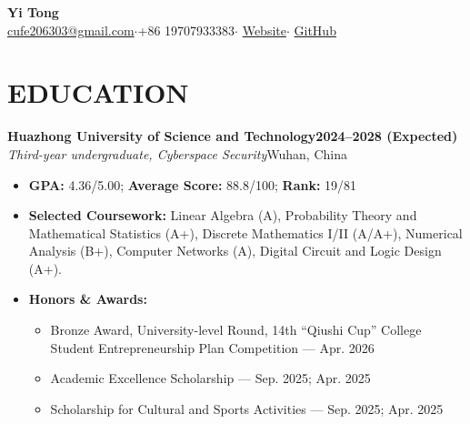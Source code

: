 \documentclass[10pt,a4paper]{article}
\begin{document}
\begin{center}
{\LARGE\bfseries Yi Tong}\\[5pt]
\href{mailto:cufe206303@gmail.com}{cufe206303@gmail.com}\enspace$\cdot$\enspace +86 19707933383\enspace$\cdot$\enspace
\href{https://cufe-hust.github.io/}{Website}\enspace$\cdot$\enspace
\href{https://github.com/CuFe-hust}{GitHub}
\end{center}
\vspace{-8pt}

\section{EDUCATION}
\textbf{Huazhong University of Science and Technology}\hfill \textbf{2024--2028 (Expected)}\\
\textit{Third-year undergraduate, Cyberspace Security}\hfill Wuhan, China
\begin{itemize}
\item \textbf{GPA:} 4.36/5.00; \textbf{Average Score:} 88.8/100; \textbf{Rank:} 19/81
\item \textbf{Selected Coursework:} Linear Algebra (A), Probability Theory and Mathematical Statistics (A+), Discrete Mathematics I/II (A/A+), Numerical Analysis (B+), Computer Networks (A), Digital Circuit and Logic Design (A+).
\item \textbf{Honors \& Awards:}
\begin{itemize}[label=\textbullet,topsep=2pt,itemsep=1pt]
\item Bronze Award, University-level Round, 14th ``Qiushi Cup'' College Student Entrepreneurship Plan Competition --- Apr. 2026
\item Academic Excellence Scholarship --- Sep. 2025; Apr. 2025
\item Scholarship for Cultural and Sports Activities --- Sep. 2025; Apr. 2025
\end{itemize}
\end{itemize}
\end{document}
